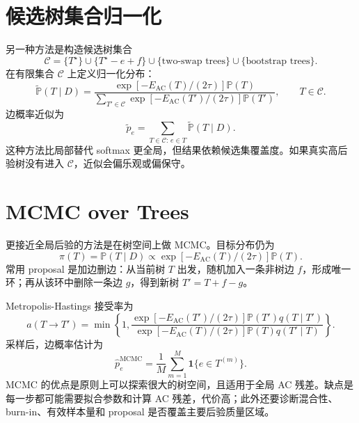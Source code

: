 \documentclass[UTF8,12pt,openany]{ctexrep}
\numberwithin{equation}{chapter}
\theoremstyle{definition}
\theoremstyle{plain}
\newcommand{\Prob}{\mathbb{P}}
\newcommand{\ind}[1]{\mathbf{1}\{#1\}}
\newcommand{\Ccal}{\mathcal{C}}
\newcommand{\Eac}{E_{\mathrm{AC}}}
\begin{document}
\section{候选树集合归一化}

另一种方法是构造候选树集合
\begin{equation}
\Ccal=
\{T^\star\}
\cup
\{T^\star-e+f\}
\cup
\{\text{two-swap trees}\}
\cup
\{\text{bootstrap trees}\}.
\label{eq:candidate-tree-set}
\end{equation}
在有限集合 $\Ccal$ 上定义归一化分布：
\begin{equation}
\widetilde{\Prob}(T\mid D)
=
\frac{
\exp[-\Eac(T)/(2\tau)]\Prob(T)
}{
\sum_{T'\in\Ccal}
\exp[-\Eac(T')/(2\tau)]\Prob(T')
},
\qquad T\in\Ccal .
\label{eq:candidate-normalized}
\end{equation}
边概率近似为
\begin{equation}
\tilde p_e
=
\sum_{T\in\Ccal:\,e\in T}\widetilde{\Prob}(T\mid D).
\label{eq:candidate-edge-prob}
\end{equation}
这种方法比局部替代 softmax 更全局，但结果依赖候选集覆盖度。如果真实高后验树没有进入 $\Ccal$，近似会偏乐观或偏保守。

\section{MCMC over Trees}

更接近全局后验的方法是在树空间上做 MCMC。目标分布仍为
\begin{equation}
\pi(T)=\Prob(T\mid D)
\propto
\exp[-\Eac(T)/(2\tau)]\Prob(T).
\label{eq:mcmc-target}
\end{equation}
常用 proposal 是加边删边：从当前树 $T$ 出发，随机加入一条非树边 $f$，形成唯一环；再从该环中删除一条边 $g$，得到新树 $T'=T+f-g$。

Metropolis-Hastings 接受率为
\begin{equation}
a(T\to T')
=
\min\left\{
1,
\frac{
\exp[-\Eac(T')/(2\tau)]\Prob(T')q(T\mid T')
}{
\exp[-\Eac(T)/(2\tau)]\Prob(T)q(T'\mid T)
}
\right\}.
\label{eq:mh-acceptance}
\end{equation}
采样后，边概率估计为
\begin{equation}
\hat p_e^{\mathrm{MCMC}}
=
\frac{1}{M}
\sum_{m=1}^{M}
\ind{e\in T^{(m)}}.
\label{eq:mcmc-edge-prob}
\end{equation}
MCMC 的优点是原则上可以探索很大的树空间，且适用于全局 AC 残差。缺点是每一步都可能需要拟合参数和计算 AC 残差，代价高；此外还要诊断混合性、burn-in、有效样本量和 proposal 是否覆盖主要后验质量区域。
\end{document}
